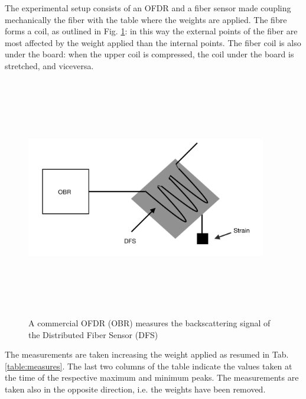 The experimental setup consists of an OFDR and a fiber sensor made coupling mechanically the fiber with the table where the weights are applied. The fibre forms a coil, as outlined in Fig. \ref{fig:setup}: in this way the external points of the fiber are most affected by the weight applied than the internal points. The fiber coil is also under the board: when the upper coil is compressed, the coil under the board is stretched, and viceversa.
\begin{figure}[H]
	\centering
	\includegraphics[height=10.5cm, width=10.5cm, keepaspectratio]{img/setup.png}
	\caption{A commercial OFDR (OBR) measures the backscattering signal of the Distributed Fiber Sensor (DFS)}\label{fig:setup}
\end{figure}
The measurements are taken increasing the weight applied as resumed in Tab.\ref{table:measures}. The last two columns of the table indicate the values taken at the time of the respective maximum and minimum peaks. The measurements are taken also in the opposite direction, i.e. the weights have been removed.
